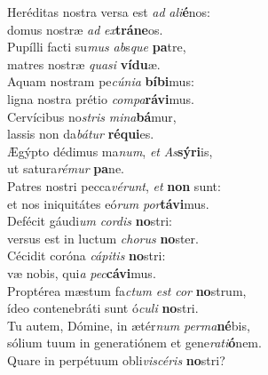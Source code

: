 \evenverse Heréditas nostra versa est \textit{ad} \textit{a}\textit{li}\textbf{é}nos:~\*\\
\evenverse domus nostræ \textit{ad} \textit{ex}\textbf{trá}\textbf{ne}os.\\
\oddverse Pupílli facti su\textit{mus} \textit{ab}s\textit{que} \textbf{pa}tre,~\*\\
\oddverse matres nostræ \textit{qua}\textit{si} \textbf{ví}\textbf{du}æ.\\
\evenverse Aquam nostram pe\textit{cú}\textit{ni}\textit{a} \textbf{bí}\textbf{bi}mus:~\*\\
\evenverse ligna nostra prétio \textit{com}\textit{pa}\textbf{rá}\textbf{vi}mus.\\
\oddverse Cervícibus no\textit{stris} \textit{mi}\textit{na}\textbf{bá}mur,~\*\\
\oddverse lassis non da\textit{bá}\textit{tur} \textbf{ré}\textbf{qui}es.\\
\evenverse Ægýpto dédimus ma\textit{num}, \textit{et} \textit{As}\textbf{sý}\textbf{ri}is,~\*\\
\evenverse ut satura\textit{ré}\textit{mur} \textbf{pa}ne.\\
\oddverse Patres nostri pecca\textit{vé}\textit{runt}, \textit{et} \textbf{non} sunt:~\*\\
\oddverse et nos iniquitátes eó\textit{rum} \textit{por}\textbf{tá}\textbf{vi}mus.\\
\evenverse Defécit gáudi\textit{um} \textit{cor}\textit{dis} \textbf{no}stri:~\*\\
\evenverse versus est in luctum \textit{cho}\textit{rus} \textbf{no}ster.\\
\oddverse Cécidit coróna \textit{cá}\textit{pi}\textit{tis} \textbf{no}stri:~\*\\
\oddverse væ nobis, qui\textit{a} \textit{pec}\textbf{cá}\textbf{vi}mus.\\
\evenverse Proptérea mæstum fa\textit{ctum} \textit{est} \textit{cor} \textbf{no}strum,~\*\\
\evenverse ídeo contenebráti sunt ó\textit{cu}\textit{li} \textbf{no}stri.\\
\oddverse Tu autem, Dómine, in ætér\textit{num} \textit{per}\textit{ma}\textbf{né}bis,~\*\\
\oddverse sólium tuum in generatiónem et gene\textit{ra}\textit{ti}\textbf{ó}nem.\\
\evenverse Quare in perpétuum obli\textit{vi}\textit{scé}\textit{ris} \textbf{no}stri?~\*\\
